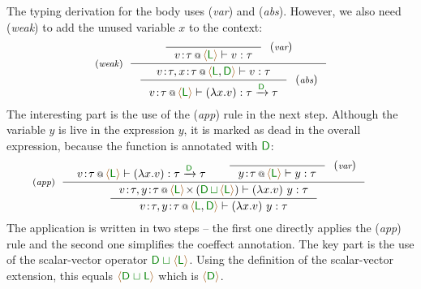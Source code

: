 The typing derivation for the body uses (\emph{var}) and (\emph{abs}). However, we also need (\emph{weak})
to add the unused variable $x$ to the context:
%
\begin{equation*}
\tyrule{weak}
{ \tyruler{var}
    {}
    { \coctx{v\!:\!\tau}{\alift{ \cclrd{\cclrd{\ident{L}}} }} \vdash v : \tau } }
{ \tyruler{abs}
    { \coctx{v\!:\!\tau, x\!:\!\tau}{\alift{ \cclrd{\cclrd{\ident{L}}},\cclrd{\cclrd{\ident{D}}} }} \vdash v : \tau }
    { \coctx{v\!:\!\tau}{\alift{ \cclrd{\cclrd{\ident{L}}} }} \vdash (\lambda x . v) : \tau \xrightarrow{\cclrd{\cclrd{\ident{D}}}} \tau }}
\end{equation*}
%
The interesting part is the use of the (\emph{app}) rule in the next step. Although the variable $y$ is live in the expression $y$,
it is marked as dead in the overall expression, because the function is annotated with $\ident{\cclrd{D}}$:
%
\begin{equation*}
\hspace{-2em}
\tyrule{app}
  {
    \begin{array}{l}
    \vspace{-1.2em}
    \coctx{v\!:\!\tau}{\alift{ \cclrd{\cclrd{\ident{L}}} }} \vdash (\lambda x . v) : \tau \xrightarrow{\cclrd{\cclrd{\ident{D}}}} \tau
    \end{array} &
    \tyruler{var}{}{\coctx{y\!:\!\tau}{\alift{ \cclrd{\cclrd{\ident{L}}} }} \vdash y : \tau}
  }
  {
  \inference
  	{ \coctx{v\!:\!\tau, y\!:\!\tau}{\alift{ \cclrd{\cclrd{\ident{L}}} } \cons\, ({ \cclrd{\cclrd{\ident{D}}} \,\cclrd{\sqcup}\, \alift{\cclrd{\cclrd{\ident{L}}}} })}
  	     \vdash (\lambda x . v)~y : \tau }
  	{ \coctx{v\!:\!\tau, y\!:\!\tau}{\alift{ \cclrd{\cclrd{\ident{L}}}, \cclrd{\cclrd{\ident{D}}} }} \vdash (\lambda x . v)~y : \tau }
  }
\end{equation*}
%
The application is written in two steps -- the first one directly applies the (\emph{app}) rule
and the second one simplifies the coeffect annotation. The key part is the use of the scalar-vector
operator $\cclrd{\cclrd{\ident{D}}} \;\cclrd{\sqcup}\; \alift{\cclrd{\cclrd{\ident{L}}}}$. Using the definition of the scalar-vector
extension, this equals $\alift{\cclrd{\cclrd{\ident{D}}} \;\cclrd{\sqcup}\; \cclrd{\cclrd{\ident{L}}}}$ which is
$\alift{\cclrd{\cclrd{\ident{D}}}}$.


